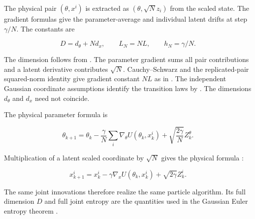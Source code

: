 \documentclass[11pt,a4paper]{article}
\begin{document}
The physical pair \((\theta,x^i)\) is extracted as \((\theta,\sqrt N z_i)\) from the scaled state. The gradient formulas \cite[Section~3.1.5]{LangevinLean2026IPLA} give the parameter-average and individual latent drifts at step \(\gamma/N\). The constants are

\[D=d_\theta+Nd_x,\qquad L_N=NL,\qquad h_N=\gamma/N.\]

The dimension follows from \cite[Section~3.1.1]{LangevinLean2026IPLA}. The parameter gradient sums all pair contributions and a latent derivative contributes \(\sqrt N\). Cauchy–Schwarz and the replicated-pair squared-norm identity give gradient constant \(NL\) as in \cite[Section~3.1.4]{LangevinLean2026IPLA}. The independent Gaussian coordinate assumptions identify the transition laws by \cite[Section~3.16.3]{LangevinLean2026IPLA}. The dimensions \(d_\theta\) and \(d_x\) need not coincide.



The physical parameter formula \cite[Section~3.1.7]{LangevinLean2026IPLA} is

\[\theta_{k+1}=\theta_k-\frac\gamma N\sum_i\nabla_\theta U(\theta_k,x_k^i)
+\sqrt{\frac{2\gamma}{N}}Z_k^\theta.\]

Multiplication of a latent scaled coordinate by \(\sqrt N\) gives the physical formula \cite[Section~3.1.7]{LangevinLean2026IPLA}:

\[x_{k+1}^i=x_k^i-\gamma\nabla_xU(\theta_k,x_k^i)+\sqrt{2\gamma}Z_k^i.\]

The same joint innovations therefore realize the same particle algorithm. Its full dimension \(D\) and full joint entropy are the quantities used in the Gaussian Euler entropy theorem \cite[Section~3.29.7]{LangevinLean2026ULALSI}.
\end{document}
